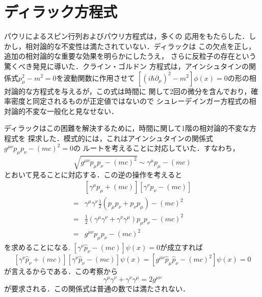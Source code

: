 \documentclass{jsarticle}
\begin{document}
\section{ディラック方程式}
\label{sec:diraceq}

パウリによるスピン行列およびパウリ方程式は，多くの
応用をもたらした．しかし，相対論的な不変性は満たされていない．ディラックは
この欠点を正し，追加の相対論的な重要な効果を明らかにしたうえ，
さらに反粒子の存在という驚くべき発見に導いた．クライン・ゴルドン
方程式は，アインシュタインの関係式$p_{\mu}^2 - m^2 =0$を波動関数に作用させて
$[(i\hbar\partial_{\mu})^2 - m^2]\phi(x)  =0$の形の相対論的な方程式を与えるが，この式は時間に
関して2回の微分を含んでおり，確率密度と同定されるものが正定値ではないので
シュレーデインガー方程式の相対論的不変な一般化と見なせない．

ディラックはこの困難を解決するために，時間に関して1階の相対論的不変な方程式を
探求した．模式的には，これはアインシュタインの関係式$g^{\mu\nu}p_{\mu}p_{\nu} - (mc)^2=0$の
ルートを考えることに対応していた．すなわち，
\[
\sqrt{g^{\mu\nu}p_{\mu}p_{\nu} - (mc)^2} \sim \gamma^\mu p_{\mu} - (mc)
\]
とおいて見ることに対応する．この逆の操作を考えると
\begin{align*}
     & [\gamma^{\mu} p_{\mu} +(mc)] [\gamma^{\nu} p_{\nu} - (mc)] \\
   = & \gamma^{\mu} \gamma^{\nu} \frac{1}{2}(p_{\mu}p_{\nu} + p_{\nu} p_{\mu}) - (mc)^2 \\
   = & \frac{1}{2} (\gamma^{\mu} \gamma^{\nu} +  \gamma^{\nu} \gamma^{\mu}) p_{\mu}p_{\nu} - (mc)^2 \\
   = & g^{\mu\nu} p_{\mu}p_{\nu} - (mc)^2
\end{align*}
を求めることになる.
$[\gamma^{\nu}\hat{p}_{\nu} - (mc)]\psi(x) = 0$が成立すれば
\[
[\gamma^{\nu}\hat{p}_{\nu} + (mc)][\gamma^{\nu}\hat{p}_{\nu} - (mc)]\psi(x) 
= [g^{\mu\nu} \hat{p}_{\mu}\hat{p}_{\nu} - (mc)^2]\psi(x) = 0
\]
が言えるからである．この考察から
\[
\gamma^\mu \gamma^\nu +  \gamma^\nu \gamma^\mu = 2 g^{\mu\nu}
\]
が要求される．この関係式は普通の数では満たされない．
\end{document}
